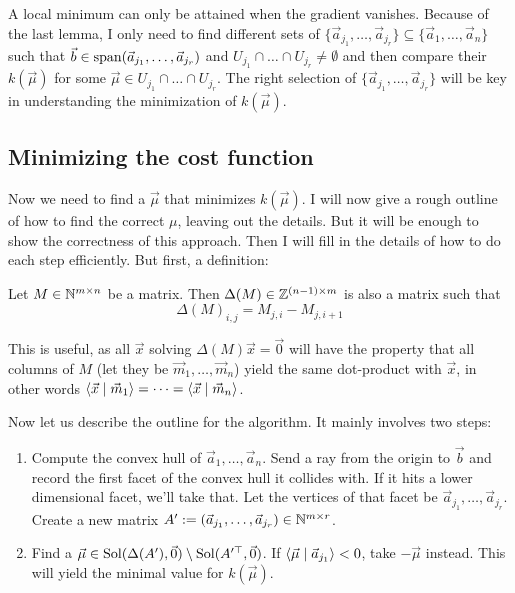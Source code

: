 A local minimum can only be attained when the gradient vanishes. Because of the last lemma, I only need to find different sets of $\{\vec a_{j_1}, \dots, \vec a_{j_r}\} \subseteq \{\vec a_1, \dots, \vec a_n\}$ such that $\vec b \in \operatorname{span}(\vec a_{j_1}, \dots, \vec a_{j_r})$ and $U_{j_1} \cap \dots \cap U_{j_r} \neq \emptyset$ and then compare their $k(\vec\mu)$ for some $\vec\mu \in U_{j_1} \cap \dots \cap U_{j_r}$. The right selection of $\{\vec a_{j_1}, \dots, \vec a_{j_r}\}$ will be key in understanding the minimization of $k(\vec\mu)$. 

\subsection{Minimizing the cost function}
Now we need to find a $\vec\mu$ that minimizes $k(\vec\mu)$. I will now give a rough outline of how to find the correct $\mu$, leaving out the details. But it will be enough to show the correctness of this approach. Then I will fill in the details of how to do each step efficiently. But first, a definition:
\begin{definition}
    Let $M \in \mathbb{N}^{m\times n}$ be a matrix. Then $\Delta(M) \in \mathbb{Z}^{(n-1)\times m}$ is also a matrix such that 
    $$\Delta(M)_{i,j} = M_{j,i} - M_{j,i+1}$$
\end{definition}
\begin{observation}
    \label{obs:delta_meaning}
    This is useful, as all $\vec x$ solving $\Delta(M)\vec x = \vec 0$ will have the property that all columns of $M$ (let they be $\vec m_1, \dots, \vec m_n$) yield the same dot-product with $\vec x$, in other words $\langle \vec x \mid \vec m_1 \rangle = \dots = \langle \vec x \mid \vec m_n \rangle$.
\end{observation}

Now let us describe the outline for the algorithm. It mainly involves two steps:
\begin{algorithm}
    \label{algo}
    \begin{enumerate}
        \item Compute the convex hull of $\vec a_1, \dots, \vec a_n$. Send a ray from the origin to $\vec b$ and record the first facet of the convex hull it collides with. If it hits a lower dimensional facet, we'll take that. Let the vertices of that facet be $\vec a_{j_1}, \dots, \vec a_{j_r}$. Create a new matrix $A' := (\vec a_{j_1}, \dots, \vec a_{j_r}) \in \mathbb{N}^{m \times r}$.
        \item Find a $\vec\mu \in \operatorname{Sol}(\Delta(A'), \vec0) \setminus \operatorname{Sol}(A'^\top, \vec0)$. If $\langle \vec\mu \mid \vec a_{j_1} \rangle<0$, take $-\vec\mu$ instead. This will yield the minimal value for $k(\vec\mu)$.
    \end{enumerate}
\end{algorithm}

